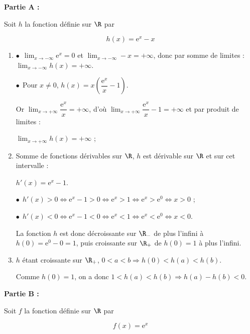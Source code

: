 \bigskip

\textbf{Partie A :}

\medskip

Soit $h$ la fonction définie sur $\R$ par

\[h(x) = \text{e}^x - x\]

\smallskip

\begin{enumerate}
\item 

$\bullet~~$$\displaystyle\lim_{x \to - \infty} \text{e}^x = 0$ et $\displaystyle\lim_{x \to - \infty} - x = + \infty$, donc par somme de limites : $\displaystyle\lim_{x \to - \infty} h(x) = + \infty$.

$\bullet~~$Pour $x \ne 0$, \: $h(x) = x\left(\dfrac{\text{e}^x}{x} - 1\right)$.

Or $\displaystyle\lim_{x \to + \infty} \dfrac{\text{e}^x}{x} = + \infty$, d'où $\displaystyle\lim_{x \to + \infty}\dfrac{\text{e}^x}{x} - 1 = + \infty$ et par produit de limites :

$\displaystyle\lim_{x \to + \infty} h(x) = + \infty$ ; 

\item 

Somme de fonctions dérivables sur $\R$, $h$ est dérivable sur $\R$ et sur cet intervalle :

$h'(x) =  \text{e}^x - 1$.

$\bullet~~$$h'(x) > 0 \iff \text{e}^x - 1 > 0 \iff \text{e}^x > 1 \iff \text{e}^x > \text{e}^0 \iff x > 0$ ;

$\bullet~~$$h'(x) < 0 \iff \text{e}^x - 1 < 0 \iff \text{e}^x < 1 \iff \text{e}^x < \text{e}^0 \iff x < 0$.

La fonction $h$ est donc décroissante sur $\R_{-}$ de plus l'infini à $h(0) = \text{e}^0 - 0 = 1$, puis croissante sur $\R_{+}$ de $h(0) = 1$ à plus l'infini.
\item 


$h$ étant croissante sur $\R_{+}$, \: $0 < a < b \Rightarrow h(0) < h(a) < h(b)$.

Comme $h(0) = 1$, on a donc $1 < h(a) < h(b) \Rightarrow h(a) - h(b) < 0$.
\end{enumerate}

\bigskip

\textbf{Partie B :}

\medskip

Soit $f$ la fonction définie sur $\R$ par

\[f(x) = \text{e}^x\]


